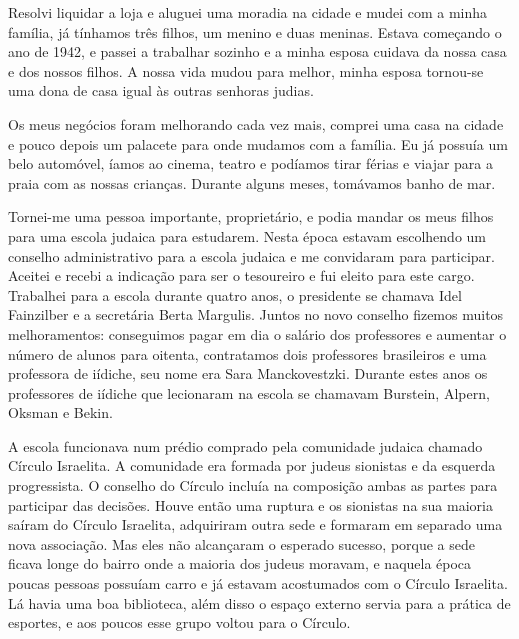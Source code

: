 Resolvi liquidar a loja e aluguei uma moradia na cidade e mudei com a
minha família, já tínhamos três filhos, um menino e duas meninas. Estava
começando o ano de 1942, e passei a trabalhar sozinho e a minha esposa
cuidava da nossa casa e dos nossos filhos. A nossa vida mudou para
melhor, minha esposa tornou-se uma dona de casa igual às outras senhoras
judias.

Os meus negócios foram melhorando cada vez mais, comprei uma casa na
cidade e pouco depois um palacete para onde mudamos com a família. Eu já
possuía um belo automóvel, íamos ao cinema, teatro e podíamos tirar
férias e viajar para a praia com as nossas crianças. Durante alguns
meses, tomávamos banho de mar.

Tornei-me uma pessoa importante, proprietário, e podia mandar os meus
filhos para uma escola judaica para estudarem. Nesta época estavam
escolhendo um conselho administrativo para a escola judaica e me
convidaram para participar. Aceitei e recebi a indicação para ser o
tesoureiro e fui eleito para este cargo. Trabalhei para a escola durante
quatro anos, o presidente se chamava Idel Fainzilber e a secretária
Berta Margulis. Juntos no novo conselho fizemos muitos melhoramentos:
conseguimos pagar em dia o salário dos professores e aumentar o número
de alunos para oitenta, contratamos dois professores brasileiros e uma
professora de iídiche, seu nome era Sara Manckovestzki. Durante estes
anos os professores de iídiche que lecionaram na escola se chamavam
Burstein, Alpern, Oksman e Bekin.

A escola funcionava num prédio comprado pela comunidade judaica chamado
Círculo Israelita. A comunidade era formada por judeus sionistas e da
esquerda progressista. O conselho do Círculo incluía na composição ambas
as partes para participar das decisões. Houve então uma ruptura e os
sionistas na sua maioria saíram do Círculo Israelita, adquiriram outra
sede e formaram em separado uma nova associação. Mas eles não alcançaram
o esperado sucesso, porque a sede ficava longe do bairro onde a maioria
dos judeus moravam, e naquela época poucas pessoas possuíam carro e já
estavam acostumados com o Círculo Israelita. Lá havia uma boa
biblioteca, além disso o espaço externo servia para a prática de
esportes, e aos poucos esse grupo voltou para o Círculo.

